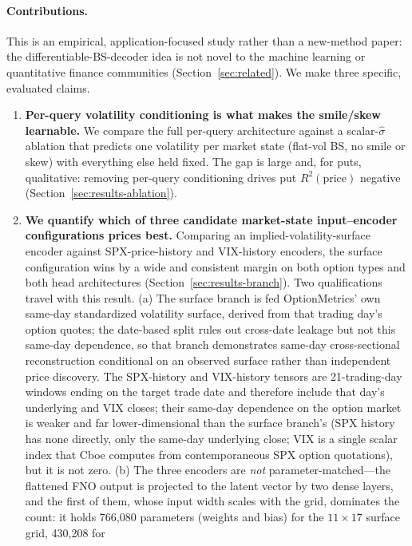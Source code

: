 \documentclass[11pt]{article}
\begin{document}
\paragraph{Contributions.} This is an empirical, application-focused study rather than a new-method
paper: the differentiable-BS-decoder idea is not novel to the machine learning or quantitative finance
communities (Section~\ref{sec:related}). We make three specific, evaluated claims.

\begin{enumerate}[leftmargin=*]
\item \textbf{Per-query volatility conditioning is what makes the smile/skew learnable.} We compare
the full per-query architecture against a scalar-$\hat\sigma$ ablation that predicts one volatility per
market state (flat-vol BS, no smile or skew) with everything else held fixed. The gap is large and, for
puts, qualitative: removing per-query conditioning drives put $R^2(\text{price})$ negative
(Section~\ref{sec:results-ablation}).
\item \textbf{We quantify which of three candidate market-state input--encoder configurations prices
best.} Comparing an implied-volatility-surface encoder against SPX-price-history and VIX-history
encoders, the surface configuration wins by a wide and consistent margin on both option types and both
head architectures (Section~\ref{sec:results-branch}). Two qualifications travel with this result.
(a) The surface branch is fed OptionMetrics' own same-day standardized volatility surface, derived
from that trading day's option quotes; the date-based split rules out cross-date leakage but not this
same-day dependence, so that branch demonstrates same-day cross-sectional reconstruction conditional
on an observed surface rather than independent price discovery. The SPX-history and VIX-history
tensors are 21-trading-day windows ending on the target trade date and therefore include that day's
underlying and VIX closes; their same-day dependence on the option market is weaker and far
lower-dimensional than the surface branch's (SPX history has none directly, only the same-day
underlying close; VIX is a single scalar index that Cboe computes from contemporaneous SPX option
quotations), but it is not zero. (b) The three encoders are \emph{not} parameter-matched---the
flattened FNO output is projected to the latent vector by two dense layers, and the first of them,
whose input width scales with the grid, dominates the count: it holds 766{,}080 parameters (weights
and bias) for the $11{\times}17$ surface grid, 430{,}208 for

\end{enumerate}
\end{document}
